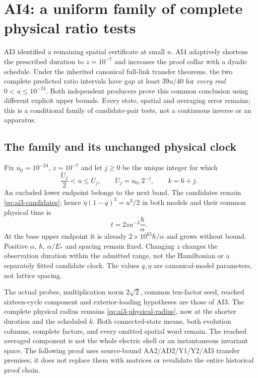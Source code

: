 \section{AI4: a uniform family of complete physical ratio tests\workstar}
AI3 identified a remaining spatial certificate at small $u$. AI4 adaptively shortens the prescribed duration to $z=10^{-7}$ and increases the proof collar with a dyadic schedule. Under the inherited canonical full-link transfer theorems, the two complete predicted ratio intervals have gap at least $39u/40$ for \emph{every real} $0<u\le10^{-24}$. Both independent producers prove this common conclusion using different explicit upper bounds. Every state, spatial and averaging error remains; this is a conditional family of candidate-pair tests, not a continuous inverse or an apparatus.

\subsection{The family and its unchanged physical clock}
Fix $u_0=10^{-24}$, $z=10^{-7}$ and let $j\ge0$ be the unique integer for which
\begin{equation}
 \frac{U_j}{2}<u\le U_j,\qquad U_j=u_0,2^{-j},\qquad k=6+j.
 \label{eq:ai4-bands}
\end{equation}
An excluded lower endpoint belongs to the next band. The candidates remain \eqref{eq:ai3-candidates}; hence $\eta(1-q)^3=u^3/2$ in both models and their common physical time is
\begin{equation}
 t=2zu^{-3}\frac{\hbar}{\alpha}.
 \label{eq:ai4-clock}
\end{equation}
At the base upper endpoint it is already $2\times10^{65}\hbar/\alpha$ and grows without bound. Positive $\alpha$, $\hbar$, $\alpha/E_*$ and spacing remain fixed. Changing $z$ changes the observation duration within the admitted range, not the Hamiltonian or a separately fitted candidate clock. The values $q,\eta$ are canonical-model parameters, not lattice spacing.

The actual probes, multiplication norm $2\sqrt2$, common ten-factor seed, reached sixteen-cycle component and exterior-loading hypotheses are those of AI3. The complete physical radius remains \eqref{eq:ai3-physical-radius}, now at the shorter duration and the scheduled $k$. Both connected-state means, both evolution columns, complete factors, and every omitted spatial word remain. The reached averaged component is not the whole electric shell or an instantaneous invariant space. The following proof uses source-bound AA2/AD2/Y1/Y2/AI3 transfer premises; it does not replace them with matrices or revalidate the entire historical proof chain.

